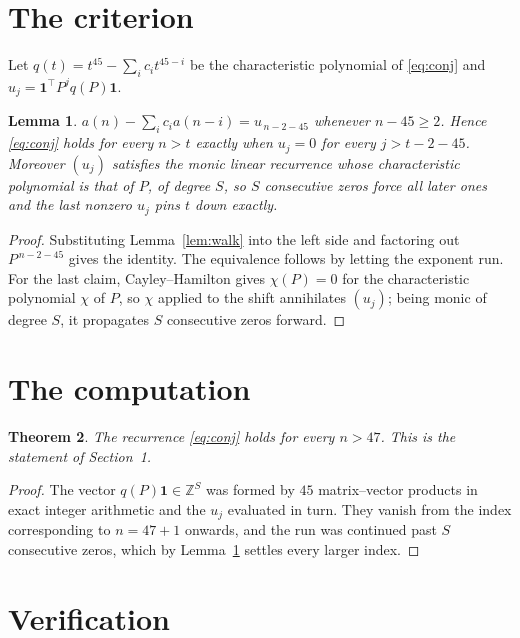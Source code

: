 \documentclass[11pt,a4paper]{article}
\theoremstyle{plain}
\newtheorem{theorem}{Theorem}
\newtheorem{lemma}[theorem]{Lemma}
\theoremstyle{definition}
\begin{document}
\section{The criterion}

Let $q(t)=t^{45}-\sum_i c_i t^{45-i}$ be the characteristic polynomial of
\eqref{eq:conj} and $u_j=\mathbf{1}^{\!\top}P^{j}q(P)\mathbf{1}$.

\begin{lemma}\label{lem:crit}
$a(n)-\sum_i c_i a(n-i)=u_{\,n-2-45}$ whenever $n-45\ge2$. Hence
\eqref{eq:conj} holds for every $n>t$ exactly when $u_j=0$ for every
$j>t-2-45$. Moreover $(u_j)$ satisfies the monic linear recurrence whose
characteristic polynomial is that of $P$, of degree $S$, so $S$ consecutive zeros force all
later ones and the last nonzero $u_j$ pins $t$ down exactly.
\end{lemma}

\begin{proof}
Substituting Lemma~\ref{lem:walk} into the left side and factoring out
$P^{\,n-2-45}$ gives the identity. The equivalence follows by letting the exponent
run. For the last claim, Cayley--Hamilton gives $\chi(P)=0$ for the characteristic
polynomial $\chi$ of $P$, so $\chi$ applied to the shift annihilates $(u_j)$; being monic of
degree $S$, it propagates $S$ consecutive zeros forward.
\end{proof}

\section{The computation}

\begin{theorem}
The recurrence \eqref{eq:conj} holds for every $n>47$. This is the statement of
Section~1.
\end{theorem}

\begin{proof}
The vector $q(P)\mathbf{1}\in\mathbb{Z}^{S}$ was formed by $45$ matrix--vector
products in exact integer arithmetic and the $u_j$ evaluated in turn. They vanish from the
index corresponding to $n=47+1$ onwards, and the run was continued past $S$ consecutive
zeros, which by Lemma~\ref{lem:crit} settles every larger index.
\end{proof}

\section{Verification}
\end{document}
